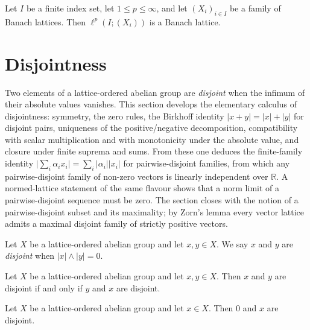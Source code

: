 \begin{theorem}
\label{thm:piLp-banachLattice}
\leanok
{}
Let $I$ be a finite index set, let $1 \le p \le \infty$, and let
$(X_i)_{i \in I}$ be a family of Banach lattices. Then
$\ell^p(I; (X_i))$ is a Banach lattice.
\end{theorem}

\section{Disjointness}

Two elements of a lattice-ordered abelian group are \emph{disjoint} when
the infimum of their absolute values vanishes. This section develops the
elementary calculus of disjointness: symmetry, the zero rules, the
Birkhoff identity $\lvert x + y \rvert = \lvert x \rvert + \lvert y \rvert$
for disjoint pairs, uniqueness of the positive/negative decomposition,
compatibility with scalar multiplication and with monotonicity under the
absolute value, and closure under finite suprema and sums. From these one
deduces the finite-family identity
$\lvert \sum_i \alpha_i x_i \rvert = \sum_i \lvert \alpha_i \rvert
\lvert x_i \rvert$ for pairwise-disjoint families, from which any
pairwise-disjoint family of non-zero vectors is linearly independent over
$\mathbb{R}$. A normed-lattice statement of the same flavour shows that
a norm limit of a pairwise-disjoint sequence must be zero. The section
closes with the notion of a pairwise-disjoint subset and its maximality;
by Zorn's lemma every vector lattice admits a maximal disjoint family of
strictly positive vectors.

\begin{definition}
\label{def:isVLDisjoint}
\leanok
Let $X$ be a lattice-ordered abelian group and let $x, y \in X$. We say
$x$ and $y$ are \emph{disjoint} when $\lvert x \rvert \wedge \lvert y
\rvert = 0$.
\end{definition}

\begin{lemma}
\label{lem:isVLDisjoint-comm}
\leanok
{}
Let $X$ be a lattice-ordered abelian group and let $x, y \in X$. Then
$x$ and $y$ are disjoint if and only if $y$ and $x$ are disjoint.
\end{lemma}

\begin{lemma}
\label{lem:isVLDisjoint-zero-left}
\leanok
{}
Let $X$ be a lattice-ordered abelian group and let $x \in X$. Then $0$
and $x$ are disjoint.
\end{lemma}

